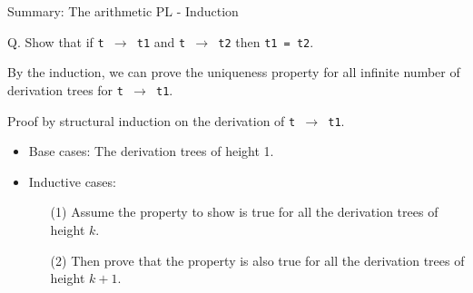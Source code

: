 \documentclass[table]{beamer}
\begin{document}
\begin{frame}[t]{Summary: The arithmetic PL - Induction} \vspace{10pt}

Q. Show that if \texttt{t $\rightarrow$ t1} and \texttt{t $\rightarrow$ t2} then \texttt{t1 = t2}.

\vspace{10pt}

By the induction, we can prove the uniqueness property for all infinite number of derivation trees for \texttt{t $\rightarrow$ t1}.

\vspace{10pt}

Proof by structural induction on the derivation of \texttt{t $\rightarrow$ t1}. 

\vspace{10pt}

\begin{itemize}
\item Base cases: The derivation trees of height 1.
\item Inductive cases: 
\begin{itemize}
\item[(1)] Assume the property to show is true for all the derivation trees of height $k$. 
\item[(2)] Then prove that the property is also true for all the derivation trees of height $k+1$.
\end{itemize}
\end{itemize}

\end{frame}
\end{document}
